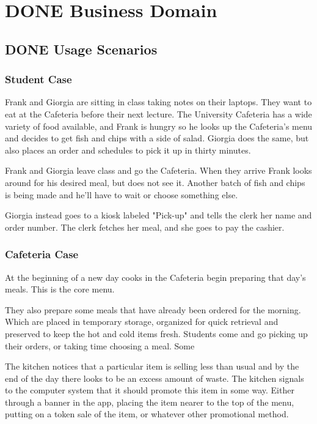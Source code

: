 \documentclass[11pt]{article}
\begin{document}
\section{{\bfseries\sffamily DONE} Business Domain}
\label{sec:org8aee3ba}
\subsection{{\bfseries\sffamily DONE} Usage Scenarios}
\label{sec:org21e1221}
\subsubsection{Student Case}
\label{sec:orgb19de00}
Frank and Giorgia are sitting in class taking notes on their
laptops. They want to eat at the Cafeteria before their next
lecture. The University Cafeteria has a wide variety of food
available, and Frank is hungry so he looks up the Cafeteria's menu
and decides to get fish and chips with a side of salad. Giorgia
does the same, but also places an order and schedules to pick it
up in thirty minutes.

Frank and Giorgia leave class and go the Cafeteria. When they
arrive Frank looks around for his desired meal, but does not see
it. Another batch of fish and chips is being made and he'll have
to wait or choose something else. 

Giorgia instead goes to a kiosk labeled "Pick-up" and tells the
clerk her name and order number. The clerk fetches her meal, and
she goes to pay the cashier.
\subsubsection{Cafeteria Case}
\label{sec:org83d3d87}
At the beginning of a new day cooks in the Cafeteria begin
preparing that day's meals. This is the core menu.

They also prepare some meals that have already been ordered for
the morning. Which are placed in temporary storage, organized for
quick retrieval and preserved to keep the hot and cold items
fresh. Students come and go picking up their orders, or taking
time choosing a meal. Some 

The kitchen notices that a particular item is selling less than
usual and by the end of the day there looks to be an excess amount
of waste. The kitchen signals to the computer system that it
should promote this item in some way. Either through a banner in
the app, placing the item nearer to the top of the menu, putting
on a token sale of the item, or whatever other promotional
method.
\end{document}
